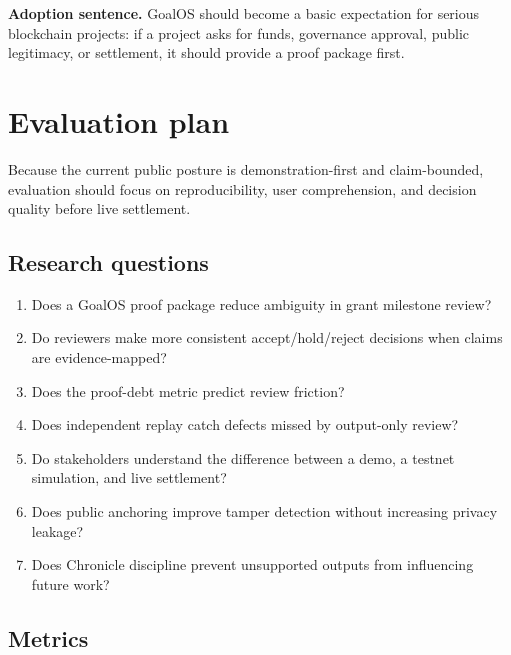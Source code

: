 \begin{prbox}
\textbf{Adoption sentence.} GoalOS should become a basic expectation for serious blockchain projects: if a project asks for funds, governance approval, public legitimacy, or settlement, it should provide a proof package first.
\end{prbox}

\section{Evaluation plan}

Because the current public posture is demonstration-first and claim-bounded, evaluation should focus on reproducibility, user comprehension, and decision quality before live settlement.

\subsection{Research questions}

\begin{enumerate}
  \item Does a GoalOS proof package reduce ambiguity in grant milestone review?
  \item Do reviewers make more consistent accept/hold/reject decisions when claims are evidence-mapped?
  \item Does the proof-debt metric predict review friction?
  \item Does independent replay catch defects missed by output-only review?
  \item Do stakeholders understand the difference between a demo, a testnet simulation, and live settlement?
  \item Does public anchoring improve tamper detection without increasing privacy leakage?
  \item Does Chronicle discipline prevent unsupported outputs from influencing future work?
\end{enumerate}

\subsection{Metrics}

